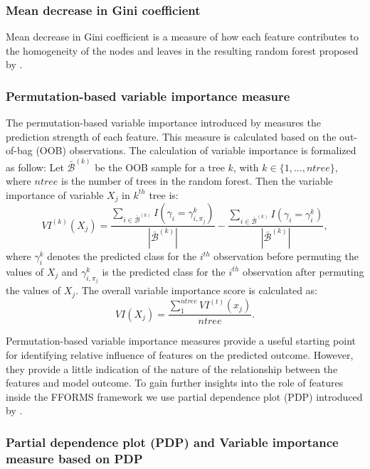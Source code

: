 \documentclass[11pt,a4paper,]{article}
\begin{document}
\hypertarget{mean-decrease-in-gini-coefficient}{%
\subsubsection{Mean decrease in Gini coefficient}\label{mean-decrease-in-gini-coefficient}}

Mean decrease in Gini coefficient is a measure of how each feature contributes to the homogeneity of the nodes and leaves in the resulting random forest proposed by \textcite{breiman2001random}.

\hypertarget{permutation-based-variable-importance-measure}{%
\subsubsection{Permutation-based variable importance measure}\label{permutation-based-variable-importance-measure}}

The permutation-based variable importance introduced by \textcite{breiman2001random} measures the prediction
strength of each feature. This measure is calculated based on the out-of-bag (OOB) observations. The calculation of variable importance is formalized as follow: Let \(\bar{\mathcal{B}}^{(k)}\) be the OOB sample for a tree \(k\), with \(k\in \{1,...,ntree\}\), where \(ntree\) is the number of trees in the random forest. Then the variable importance of variable \(X_{j}\) in \(k^{th}\) tree is:
\[VI^{(k)}(X_{j})=\frac{\sum_{i\in \bar{\mathcal{B}}^{(k)}}I(\gamma_{i}=\gamma_{i,\pi_{j}}^{k})}{|\bar{\mathcal{B}}^{(k)}|}-\frac{\sum_{i\in \bar{\mathcal{B}}^{(k)}}I(\gamma_{i}=\gamma_{i}^{k})}{|\bar{\mathcal{B}}^{(k)}|},\]
where \(\gamma_{i}^{k}\) denotes the predicted class for the \(i^{th}\) observation before permuting the values of \(X_{j}\) and \(\gamma_{i, \pi_{j}}^{k}\) is the predicted class for the \(i^{th}\) observation after permuting the values of \(X_{j}\). The overall variable importance score is calculated as:
\[VI(X_{j})=\frac{\sum_{1}^{ntree}VI^{(t)}(x_{j})}{ntree}.\]

Permutation-based variable importance measures provide a useful starting point for identifying relative influence of features on the predicted outcome. However, they provide a little indication of the nature of the relationship between the features and model outcome. To gain further insights into the role of features inside the FFORMS framework we use partial dependence plot (PDP) introduced by \textcite{friedman2008predictive}.

\hypertarget{partial-dependence-plot-pdp-and-variable-importance-measure-based-on-pdp}{%
\subsubsection{Partial dependence plot (PDP) and Variable importance measure based on PDP}\label{partial-dependence-plot-pdp-and-variable-importance-measure-based-on-pdp}}
\end{document}
